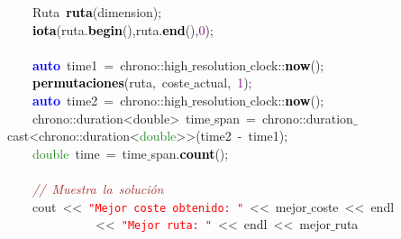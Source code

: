 \mbox{}\ \ \ \ \textcolor{TealBlue}{Ruta}\ \textbf{\textcolor{Black}{ruta}}\textcolor{BrickRed}{(}dimension\textcolor{BrickRed}{);} \\
\mbox{}\ \ \ \ \textbf{\textcolor{Black}{iota}}\textcolor{BrickRed}{(}ruta\textcolor{BrickRed}{.}\textbf{\textcolor{Black}{begin}}\textcolor{BrickRed}{(),}ruta\textcolor{BrickRed}{.}\textbf{\textcolor{Black}{end}}\textcolor{BrickRed}{(),}\textcolor{Purple}{0}\textcolor{BrickRed}{);} \\
\mbox{} \\
\mbox{}\ \ \ \ \textbf{\textcolor{Blue}{auto}}\ time1\ \textcolor{BrickRed}{=}\ chrono\textcolor{BrickRed}{::}high$\_$resolution$\_$clock\textcolor{BrickRed}{::}\textbf{\textcolor{Black}{now}}\textcolor{BrickRed}{();} \\
\mbox{}\ \ \ \ \textbf{\textcolor{Black}{permutaciones}}\textcolor{BrickRed}{(}ruta\textcolor{BrickRed}{,}\ coste$\_$actual\textcolor{BrickRed}{,}\ \textcolor{Purple}{1}\textcolor{BrickRed}{);} \\
\mbox{}\ \ \ \ \textbf{\textcolor{Blue}{auto}}\ time2\ \textcolor{BrickRed}{=}\ chrono\textcolor{BrickRed}{::}high$\_$resolution$\_$clock\textcolor{BrickRed}{::}\textbf{\textcolor{Black}{now}}\textcolor{BrickRed}{();} \\
\mbox{}\ \ \ \ chrono\textcolor{BrickRed}{::}\textcolor{TealBlue}{duration\textless{}double\textgreater{}}\ time$\_$span\ \textcolor{BrickRed}{=}\ chrono\textcolor{BrickRed}{::}duration$\_$cast\textcolor{BrickRed}{\textless{}}chrono\textcolor{BrickRed}{::}duration\textcolor{BrickRed}{\textless{}}\textcolor{ForestGreen}{double}\textcolor{BrickRed}{\textgreater{}\textgreater{}(}time2\ \textcolor{BrickRed}{-}\ time1\textcolor{BrickRed}{);} \\
\mbox{}\ \ \ \ \textcolor{ForestGreen}{double}\ time\ \textcolor{BrickRed}{=}\ time$\_$span\textcolor{BrickRed}{.}\textbf{\textcolor{Black}{count}}\textcolor{BrickRed}{();} \\
\mbox{} \\
\mbox{}\ \ \ \ \textit{\textcolor{Brown}{//\ Muestra\ la\ solución}} \\
\mbox{}\ \ \ \ cout\ \textcolor{BrickRed}{\textless{}\textless{}}\ \texttt{\textcolor{Red}{"{}Mejor\ coste\ obtenido:\ "{}}}\ \textcolor{BrickRed}{\textless{}\textless{}}\ mejor$\_$coste\ \textcolor{BrickRed}{\textless{}\textless{}}\ endl \\
\mbox{}\ \ \ \ \ \ \ \ \ \ \ \ \ \ \textcolor{BrickRed}{\textless{}\textless{}}\ \texttt{\textcolor{Red}{"{}Mejor\ ruta:\ "{}}}\ \textcolor{BrickRed}{\textless{}\textless{}}\ endl\ \textcolor{BrickRed}{\textless{}\textless{}}\ mejor$\_$ruta \\
